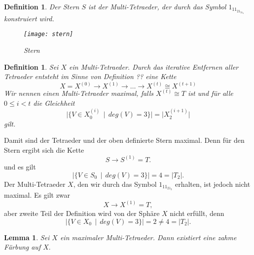 \documentclass[12pt,titlepage,twoside,cleardoublepage]{article}
\newtheorem{definition}[zahl]{Definition}
\newtheorem{lemma}[zahl]{Lemma}
\numberwithin{equation}{section}
\begin{document}
\begin{definition}
Der \emph{Stern} $S$ ist der Multi-Tetraeder, der durch das Symbol $1_11_21_31_4$ konstruiert wird.
\begin{figure}[H]
\begin{center}
\texttt{[image: stern]}
\end{center}
\caption{Stern}
\end{figure}
\end{definition}
\begin{definition}
Sei $X$ ein Multi-Tetraeder. Durch das iterative Entfernen aller Tetraeder entsteht im Sinne von Definition ?? eine Kette 
\[
X=X^{(0)}\to X^{(1)}\to \ldots \to X^{(t)}\cong X^{(t+1)}
\]
Wir nennen einen Multi-Tetraeder \emph{maximal}, falls $X^{(t)}\cong T$ ist und für alle $0\leq i< t$ die Gleichheit
\[
\vert \{V\in X_0^{(i)}\,\mid \, deg(V)=3\}\vert=\vert X^{(i+1)}_2\vert 
\]
gilt.
\end{definition}
Damit sind der Tetraeder und der oben definierte Stern maximal. 
Denn für den Stern ergibt sich die Kette 
\[
S\to S^{(1)}=T.
\]
und es gilt 
\[
\vert \{V\in S_0\,\mid \, deg(V)=3\}\vert=4=\vert T_2\vert .
\]
Der Multi-Tetraeder $X$, den wir durch das Symbol $1_11_21_3$ erhalten, ist jedoch nicht maximal. Es gilt zwar
\[
X\to X^{(1)}=T,
\] 
aber zweite Teil der Definition wird von der Sphäre $X$ nicht erfüllt, denn 
\[
\vert \{V\in X_0\,\mid \, deg(V)=3\}\vert=2\neq 4=\vert T_2\vert.
\]
\begin{lemma}\label{max}
Sei $X$ ein maximaler Multi-Tetraeder. Dann existiert eine zahme Färbung auf $X.$
\end{lemma}
\end{document}

